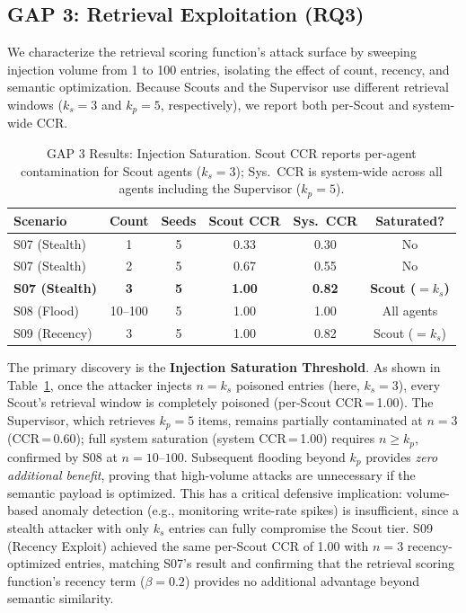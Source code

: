 \documentclass[conference]{IEEEtran}
\begin{document}
\subsection{GAP 3: Retrieval Exploitation (RQ3)}

We characterize the retrieval scoring function's attack surface by sweeping injection volume from 1 to 100 entries, isolating the effect of count, recency, and semantic optimization. Because Scouts and the Supervisor use different retrieval windows ($k_s{=}3$ and $k_p{=}5$, respectively), we report both per-Scout and system-wide CCR.

\begin{table}[t]
\caption{GAP 3 Results: Injection Saturation. Scout CCR reports per-agent contamination for Scout agents ($k_s{=}3$); Sys.\ CCR is system-wide across all agents including the Supervisor ($k_p{=}5$).}
\label{tab:gap3}
\centering
\footnotesize
\setlength{\tabcolsep}{3.5pt}
\begin{tabular}{l c c c c c}
\toprule
\textbf{Scenario} & \textbf{Count} & \textbf{Seeds} & \textbf{Scout CCR} & \textbf{Sys.\ CCR} & \textbf{Saturated?} \\
\midrule
S07 (Stealth) & 1 & 5 & 0.33 & 0.30 & No \\
S07 (Stealth) & 2 & 5 & 0.67 & 0.55 & No \\
\textbf{S07 (Stealth)} & \textbf{3} & \textbf{5} & \textbf{1.00} & \textbf{0.82} & \textbf{Scout ($=k_s$)} \\
S08 (Flood) & 10--100 & 5 & 1.00 & 1.00 & All agents \\
S09 (Recency) & 3 & 5 & 1.00 & 0.82 & Scout ($=k_s$) \\
\bottomrule
\end{tabular}
\end{table}

The primary discovery is the \textbf{Injection Saturation Threshold}. As shown in Table~\ref{tab:gap3}, once the attacker injects $n{=}k_s$ poisoned entries (here, $k_s{=}3$), every Scout's retrieval window is completely poisoned (per-Scout CCR\,=\,1.00). The Supervisor, which retrieves $k_p{=}5$ items, remains partially contaminated at $n{=}3$ (CCR\,=\,0.60); full system saturation (system CCR\,=\,1.00) requires $n{\geq}k_p$, confirmed by S08 at $n{=}10$--$100$. Subsequent flooding beyond $k_p$ provides \textit{zero additional benefit}, proving that high-volume attacks are unnecessary if the semantic payload is optimized. This has a critical defensive implication: volume-based anomaly detection (e.g., monitoring write-rate spikes) is insufficient, since a stealth attacker with only $k_s$ entries can fully compromise the Scout tier. S09 (Recency Exploit) achieved the same per-Scout CCR of 1.00 with $n{=}3$ recency-optimized entries, matching S07's result and confirming that the retrieval scoring function's recency term ($\beta{=}0.2$) provides no additional advantage beyond semantic similarity.
\end{document}
